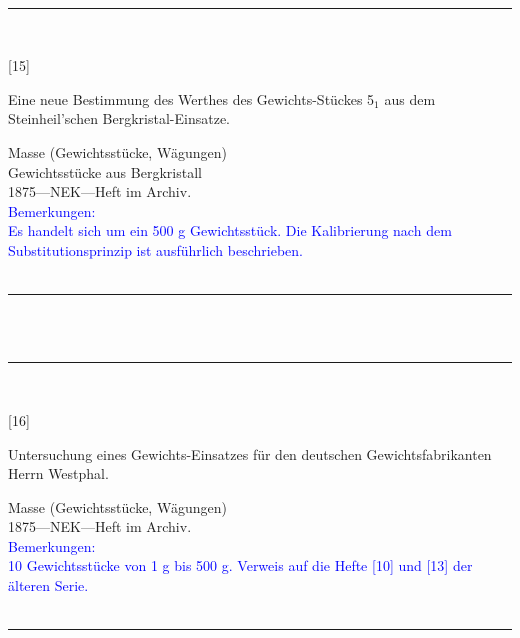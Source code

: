 \vspace*{-2.5pt}\\
\parbox{\textwidth}{%
\rule{\textwidth}{1pt}\vspace*{-3mm}\\
\begin{minipage}[t]{0.15\textwidth}\vspace{0pt}
\Huge\rule[-4mm]{0cm}{1cm}[15]
\end{minipage}
\hfill
\begin{minipage}[t]{0.85\textwidth}\vspace{0pt}
\large Eine neue Bestimmung des Werthes des Gewichts-Stückes {\glqq}5$_\mathrm{1}${\grqq} aus dem Steinheil'schen Bergkristal-Einsatze.\rule[-2mm]{0mm}{2mm}
\end{minipage}
{\footnotesize\flushright
Masse (Gewichtsstücke, Wägungen)\\
Gewichtsstücke aus Bergkristall\\
}
1875\quad---\quad NEK\quad---\quad Heft im Archiv.\\
\textcolor{blue}{Bemerkungen:\\{}
Es handelt sich um ein 500 g Gewichtsstück. Die Kalibrierung nach dem Substitutionsprinzip ist ausführlich beschrieben.\\{}
}
\\[-15pt]
\rule{\textwidth}{1pt}
}
\\
\vspace*{-2.5pt}\\
\parbox{\textwidth}{%
\rule{\textwidth}{1pt}\vspace*{-3mm}\\
\begin{minipage}[t]{0.15\textwidth}\vspace{0pt}
\Huge\rule[-4mm]{0cm}{1cm}[16]
\end{minipage}
\hfill
\begin{minipage}[t]{0.85\textwidth}\vspace{0pt}
\large Untersuchung eines Gewichts-Einsatzes für den deutschen Gewichtsfabrikanten Herrn {\glqq}Westphal{\grqq}.\rule[-2mm]{0mm}{2mm}
\end{minipage}
{\footnotesize\flushright
Masse (Gewichtsstücke, Wägungen)\\
}
1875\quad---\quad NEK\quad---\quad Heft im Archiv.\\
\textcolor{blue}{Bemerkungen:\\{}
10 Gewichtsstücke von 1 g bis 500 g. Verweis auf die Hefte [10] und [13] der älteren Serie.\\{}
}
\\[-15pt]
\rule{\textwidth}{1pt}
}

